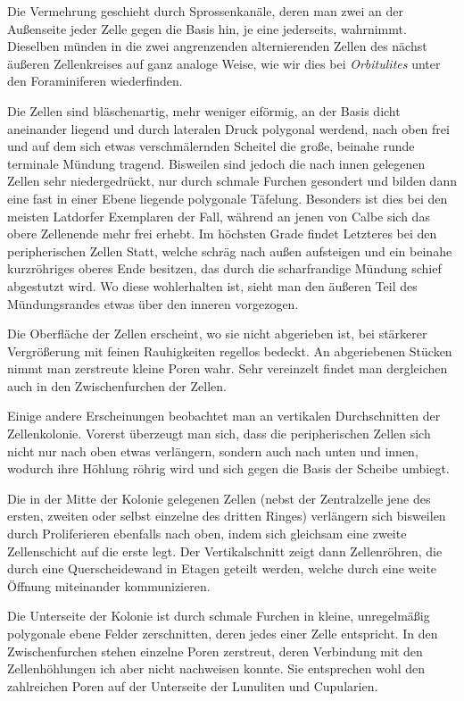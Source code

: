 \documentclass[a4paper, 11pt, oneside, german]{article}
\begin{document}
Die Vermehrung geschieht durch Sprossenkanäle, deren man zwei an der Außenseite jeder Zelle gegen die Basis hin, je eine jederseits, wahrnimmt. Dieselben münden in die zwei angrenzenden alternierenden Zellen des nächst äußeren Zellenkreises auf ganz analoge Weise, wie wir dies bei \emph{Orbitulites} unter den Foraminiferen wiederfinden.

Die Zellen sind bläschenartig, mehr weniger eiförmig, an der Basis dicht aneinander liegend und durch lateralen Druck polygonal werdend, nach oben frei und auf dem sich etwas verschmälernden Scheitel die große, beinahe runde terminale Mündung tragend. Bisweilen sind jedoch die nach innen gelegenen Zellen sehr niedergedrückt, nur durch schmale Furchen gesondert und bilden dann eine fast in einer Ebene liegende polygonale Täfelung. Besonders ist dies bei den meisten Latdorfer Exemplaren der Fall, während an jenen von Calbe sich das obere Zellenende mehr frei erhebt. Im höchsten Grade findet Letzteres bei den peripherischen Zellen Statt, welche schräg nach außen aufsteigen und ein beinahe kurzröhriges oberes Ende besitzen, das durch die scharfrandige Mündung schief abgestutzt wird. Wo diese wohlerhalten ist, sieht man den äußeren Teil des Mündungsrandes etwas über den inneren vorgezogen.

Die Oberfläche der Zellen erscheint, wo sie nicht abgerieben ist, bei stärkerer Vergrößerung mit feinen Rauhigkeiten regellos bedeckt. An abgeriebenen Stücken nimmt man zerstreute kleine Poren wahr. Sehr vereinzelt findet man dergleichen auch in den Zwischenfurchen der Zellen.

Einige andere Erscheinungen beobachtet man an vertikalen Durchschnitten der Zellenkolonie. Vorerst überzeugt man sich, dass die peripherischen Zellen sich nicht nur nach oben etwas verlängern, sondern auch nach unten und innen, wodurch ihre Höhlung röhrig wird und sich gegen die Basis der Scheibe umbiegt.

Die in der Mitte der Kolonie gelegenen Zellen (nebst der Zentralzelle jene des ersten, zweiten oder selbst einzelne des dritten Ringes) verlängern sich bisweilen durch Proliferieren ebenfalls nach oben, indem sich gleichsam eine zweite Zellenschicht auf die erste legt. Der Vertikalschnitt zeigt dann Zellenröhren, die durch eine Querscheidewand in Etagen geteilt werden, welche durch eine weite Öffnung miteinander kommunizieren.

Die Unterseite der Kolonie ist durch schmale Furchen in kleine, unregelmäßig polygonale ebene Felder zerschnitten, deren jedes einer Zelle entspricht. In den Zwischenfurchen stehen einzelne Poren zerstreut, deren Verbindung mit den Zellenhöhlungen ich aber nicht nachweisen konnte. Sie entsprechen wohl den zahlreichen Poren auf der Unterseite der Lunuliten und Cupularien.
\end{document}

